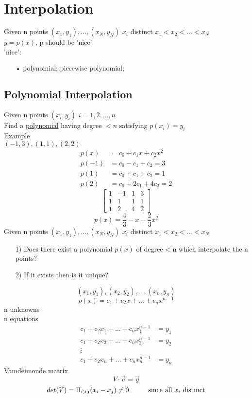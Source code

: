 \documentclass[10pt,usletter]{article}
\newcommand{\tab}[1][1cm]{\hspace*{#1}}
\begin{document}
\section{Interpolation}
Given n points $(x_1, y_1),\hdots, (x_N, y_N)$ $x_i$ distinct $x_1<x_2<\hdots<x_N$ \\
$y=p(x)$, p should be 'nice'\\
'nice':
\begin{enumerate}
\item[•] polynomial; piecewise polynomial;
\end{enumerate}
\subsection{Polynomial Interpolation}
Given n points $(x_i, y_i)$  $i=1,2,\hdots,n$\\
Find a \underline{polynomial} having degree $<n$ satisfying $p(x_i)=y_i$\\
\underline{Example}\\
$(-1,3),(1,1), (2,2)$\\
\begin{align*}
p(x)&=c_0+c_1x+c_2x^2\\
p(-1)&=c_0-c_1+c_2=3\\
p(1)&=c_0+c_1+c_2=1\\
p(2)&=c_0+2c_1+4c_2=2
\end{align*}
$$
\begin{bmatrix}
1 & -1 & 1 & 3\\
1 & 1 & 1 & 1\\
1 & 2 & 4 & 2
\end{bmatrix}
$$
$$p(x)=\frac{4}{3} - x + \frac{2}{3}x^2$$
Given n points $(x_1, y_1),\hdots, (x_N, y_N)$ $x_i$ distinct $x_1<x_2<\hdots<x_N$ 
\begin{enumerate}
\item[1)] Does there exist a polynomial $p(x)$ of degree < n which interpolate the n points?
\item[2)] If it exists then is it unique?
\end{enumerate}
$$(x_1,y_1), (x_2,y_2), \dots, (x_n, y_n)$$
$$p(x)=c_1+c_2x+\hdots +c_nx^{n-1}$$
n unknowns\\
n equations
\begin{align*}
c_1+c_2x_1+\hdots +c_nx_1^{n-1}&=y_1\\
c_1+c_2x_2+\hdots +c_nx_2^{n-1}&=y_2\\
\vdots\\
c_1+c_2x_n+\hdots +c_nx_n^{n-1}&=y_n
\end{align*}
Vamdeimonde matrix
$$V \cdot\vec{c}=\vec{y}$$
$$det(V)=\Pi_{i>j}(x_i-x_j)\neq 0 \tab \text{since all $x_i$ distinct}$$
\end{document}
